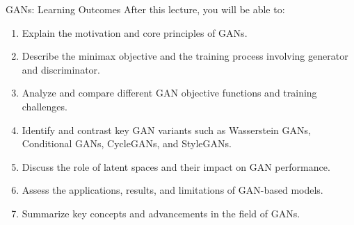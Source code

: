 \begin{frame}[allowframebreaks]{GANs: Learning Outcomes}
    After this lecture, you will be able to:
    \begin{enumerate}
        \setlength{\itemsep}{-0.1em}
        \item Explain the motivation and core principles of GANs.
        \item Describe the minimax objective and the training process involving generator and discriminator.
        \item Analyze and compare different GAN objective functions and training challenges.
        \item Identify and contrast key GAN variants such as Wasserstein GANs, Conditional GANs, CycleGANs, and StyleGANs.
        \item Discuss the role of latent spaces and their impact on GAN performance.
        \item Assess the applications, results, and limitations of GAN-based models.
        \item Summarize key concepts and advancements in the field of GANs.
    \end{enumerate}
\end{frame}